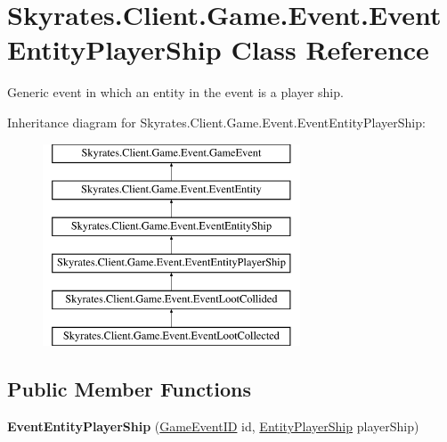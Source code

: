 \hypertarget{class_skyrates_1_1_client_1_1_game_1_1_event_1_1_event_entity_player_ship}{\section{Skyrates.\-Client.\-Game.\-Event.\-Event\-Entity\-Player\-Ship Class Reference}
\label{class_skyrates_1_1_client_1_1_game_1_1_event_1_1_event_entity_player_ship}
}


Generic event in which an entity in the event is a player ship.  


Inheritance diagram for Skyrates.\-Client.\-Game.\-Event.\-Event\-Entity\-Player\-Ship\-:\begin{figure}[H]
\begin{center}
\leavevmode
\includegraphics[height=6.000000cm]{class_skyrates_1_1_client_1_1_game_1_1_event_1_1_event_entity_player_ship}
\end{center}
\end{figure}
\subsection*{Public Member Functions}
\begin{DoxyCompactItemize}
\item 
\hypertarget{class_skyrates_1_1_client_1_1_game_1_1_event_1_1_event_entity_player_ship_a834396c60fe40f7782c5a8f506068d25}{{\bfseries Event\-Entity\-Player\-Ship} (\hyperlink{namespace_skyrates_1_1_client_1_1_game_1_1_event_a3a7e5dc62ad299d5e53abb4a3e5d5088}{Game\-Event\-I\-D} id, \hyperlink{class_skyrates_1_1_client_1_1_entity_1_1_entity_player_ship}{Entity\-Player\-Ship} player\-Ship)}\label{class_skyrates_1_1_client_1_1_game_1_1_event_1_1_event_entity_player_ship_a834396c60fe40f7782c5a8f506068d25}

\end{DoxyCompactItemize}
